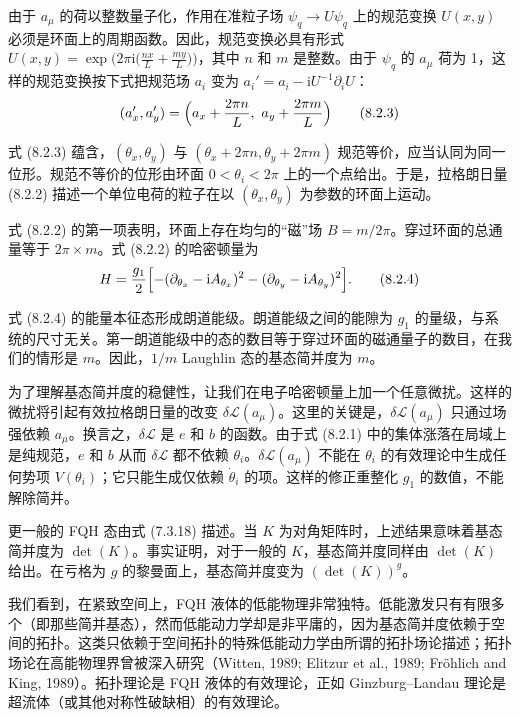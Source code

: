 由于 $a_\mu$ 的荷以整数量子化，作用在准粒子场 $\psi_q \to U\psi_q$ 上的规范变换 $U(x,y)$ 必须是环面上的周期函数。因此，规范变换必具有形式 $U(x,y) = \exp\bigl(2\pi\mathrm{i}\bigl(\frac{nx}{L} + \frac{my}{L}\bigr)\bigr)$，其中 $n$ 和 $m$ 是整数。由于 $\psi_q$ 的 $a_\mu$ 荷为 1，这样的规范变换按下式把规范场 $a_i$ 变为 $a_i' = a_i - \mathrm{i}U^{-1}\partial_i U$：
\begin{equation*}
(a_x', a_y') = \Bigl(a_x + \frac{2\pi n}{L},\ a_y + \frac{2\pi m}{L}\Bigr) \tag{8.2.3}
\end{equation*}

式 (8.2.3) 蕴含，$(\theta_x, \theta_y)$ 与 $(\theta_x + 2\pi n, \theta_y + 2\pi m)$ 规范等价，应当认同为同一位形。规范不等价的位形由环面 $0 < \theta_i < 2\pi$ 上的一个点给出。于是，拉格朗日量 (8.2.2) 描述一个单位电荷的粒子在以 $(\theta_x, \theta_y)$ 为参数的环面上运动。

式 (8.2.2) 的第一项表明，环面上存在均匀的“磁”场 $B = m/2\pi$。穿过环面的总通量等于 $2\pi \times m$。式 (8.2.2) 的哈密顿量为
\begin{equation*}
H = \frac{g_1}{2} \Bigl[- (\partial_{\theta_x} - \mathrm{i} A_{\theta_x})^2 - (\partial_{\theta_y} - \mathrm{i} A_{\theta_y})^2 \Bigr]. \tag{8.2.4}
\end{equation*}

式 (8.2.4) 的能量本征态形成朗道能级。朗道能级之间的能隙为 $g_1$ 的量级，与系统的尺寸无关。第一朗道能级中的态的数目等于穿过环面的磁通量子的数目，在我们的情形是 $m$。因此，$1/m$ Laughlin 态的基态简并度为 $m$。

为了理解基态简并度的稳健性，让我们在电子哈密顿量上加一个任意微扰。这样的微扰将引起有效拉格朗日量的改变 $\delta\mathcal{L}(a_\mu)$。这里的关键是，$\delta\mathcal{L}(a_\mu)$ 只通过场强依赖 $a_\mu$。换言之，$\delta\mathcal{L}$ 是 $e$ 和 $b$ 的函数。由于式 (8.2.1) 中的集体涨落在局域上是纯规范，$e$ 和 $b$ 从而 $\delta\mathcal{L}$ 都不依赖 $\theta_i$。$\delta\mathcal{L}(a_\mu)$ 不能在 $\theta_i$ 的有效理论中生成任何势项 $V(\theta_i)$；它只能生成仅依赖 $\dot{\theta}_i$ 的项。这样的修正重整化 $g_1$ 的数值，不能解除简并。

更一般的 FQH 态由式 (7.3.18) 描述。当 $K$ 为对角矩阵时，上述结果意味着基态简并度为 $\det(K)$。事实证明，对于一般的 $K$，基态简并度同样由 $\det(K)$ 给出。在亏格为 $g$ 的黎曼面上，基态简并度变为 $(\det(K))^g$。

我们看到，在紧致空间上，FQH 液体的低能物理非常独特。低能激发只有有限多个（即那些简并基态），然而低能动力学却是非平庸的，因为基态简并度依赖于空间的拓扑。这类只依赖于空间拓扑的特殊低能动力学由所谓的拓扑场论描述；拓扑场论在高能物理界曾被深入研究（Witten, 1989; Elitzur et al., 1989; Fr\"{o}hlich and King, 1989）。拓扑理论是 FQH 液体的有效理论，正如 Ginzburg--Landau 理论是超流体（或其他对称性破缺相）的有效理论。

